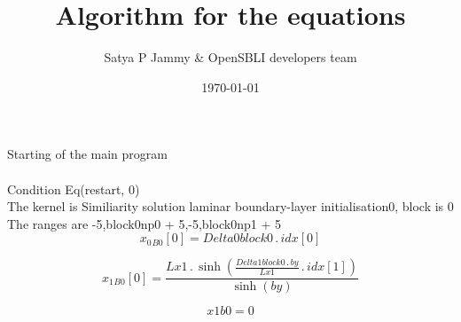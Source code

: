 \documentclass{article}
\title{Algorithm for the equations}
\author{Satya P Jammy \& OpenSBLI developers team}
\date{\today}
\begin{document}
\maketitle
\noindent Starting of the main program\\
\\\noindent Condition Eq(restart, 0)\\\noindent The kernel is Similiarity solution laminar boundary-layer initialisation0, block is 0\\\noindent The ranges are -5,block0np0 + 5,-5,block0np1 + 5\\\begin{dmath}{x_{0}{_{B0}}}[{0}] = Delta0block0 \,.\, {idx}[{0}]\end{dmath}

\begin{dmath}{x_{1}{_{B0}}}[{0}] = \frac{Lx1 \,.\, \sinh{\left (\frac{Delta1block0 \,.\, by}{Lx1} \,.\, {idx}[{1}] \right )}}{\sinh{\left (by \right )}}\end{dmath}

\begin{dmath}x1b0 = 0\end{dmath}
\end{document}
